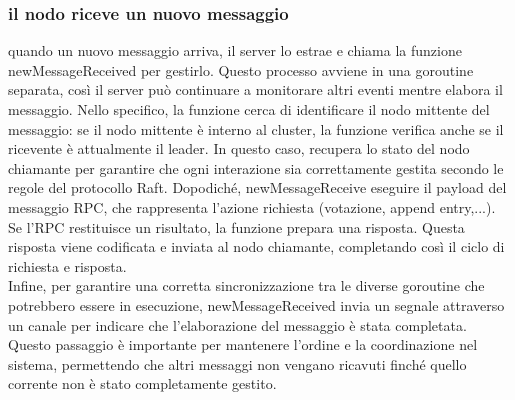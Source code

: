 \subsubsection{il nodo riceve un nuovo messaggio}
quando un nuovo messaggio arriva, il server lo estrae e chiama la funzione newMessageReceived per gestirlo. Questo processo avviene in una goroutine separata, così il server può continuare a monitorare altri eventi mentre 
elabora il messaggio. Nello specifico, la funzione cerca di identificare il nodo mittente del messaggio: se il nodo mittente è interno al cluster, la funzione verifica anche se il ricevente è attualmente il leader. 
In questo caso, recupera lo stato del nodo chiamante per garantire che ogni interazione sia correttamente gestita secondo le regole del protocollo Raft.
Dopodiché, newMessageReceive eseguire il payload del messaggio RPC, che rappresenta l'azione richiesta (votazione, append entry,...).
Se l'RPC restituisce un risultato, la funzione prepara una risposta. Questa risposta viene codificata e inviata al nodo chiamante, completando così il ciclo di richiesta e risposta.\\
Infine, per garantire una corretta sincronizzazione tra le diverse goroutine che potrebbero essere in esecuzione, newMessageReceived invia un segnale attraverso un canale per indicare che l'elaborazione del messaggio è stata completata. Questo passaggio è importante per mantenere l’ordine e la coordinazione nel sistema, permettendo che altri messaggi non vengano ricavuti finché quello corrente non è stato completamente gestito. 


